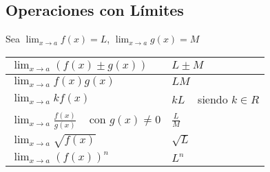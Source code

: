 \documentclass[11pt, a4paper]{article}
\begin{document}
{\subsection{Operaciones con L\'imites}
Sea $\displaystyle \lim_{ x\to a} f(x) = L $, $\displaystyle \lim_{ x\to a} g(x) = M $ 
\begin{center}
\begin{tabular}{ | m | m | } 
  \hline
  $\displaystyle \lim_{ x\to a} ( f(x) \pm g(x) ) $ & $ L \pm M  $  \\ 
  \hline
  $\displaystyle \lim_{ x\to a}  f(x)g(x)  $ & $LM$  \\ 
  \hline
  $\displaystyle \lim_{ x\to a} kf(x)  $ & $kL$ ~ siendo $k \in R$ \\
  \hline
  $\displaystyle \lim_{ x\to a} \frac{f(x)}{g(x)}$ ~ con $g(x) \neq 0 $ & $\frac{L}{M}  $ \\
  \hline
  $\displaystyle \lim_{ x\to a} \sqrt{f(x)} $ & $\sqrt{L} $ \\
  \hline
  $\displaystyle \lim_{ x\to a} ( f(x) )^n $ & $L^n $ \\  \hline
  

\end{tabular}
\end{center}}
\end{document}
